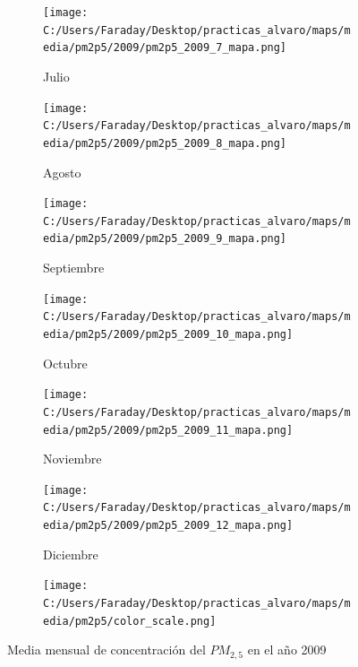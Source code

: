 \documentclass[12pt]{article}
\begin{document}
\begin{figure}[H]
\begin{subfigure}[H]{0.15\textwidth}
\texttt{[image: C:/Users/Faraday/Desktop/practicas\_alvaro/maps/media/pm2p5/2009/pm2p5\_2009\_7\_mapa.png]}
\captionsetup{labelformat=empty}
\caption{Julio}
\label{fig:map-pm2p5-2009-7}
\end{subfigure}
%
\begin{subfigure}[H]{0.15\textwidth}
\texttt{[image: C:/Users/Faraday/Desktop/practicas\_alvaro/maps/media/pm2p5/2009/pm2p5\_2009\_8\_mapa.png]}
\captionsetup{labelformat=empty}
\caption{Agosto}
\label{fig:map-pm2p5-2009-8}
\end{subfigure}
%
\begin{subfigure}[H]{0.15\textwidth}
\texttt{[image: C:/Users/Faraday/Desktop/practicas\_alvaro/maps/media/pm2p5/2009/pm2p5\_2009\_9\_mapa.png]}
\captionsetup{labelformat=empty}
\caption{Septiembre}
\label{fig:map-pm2p5-2009-9}
\end{subfigure}
%
\begin{subfigure}[H]{0.15\textwidth}
\texttt{[image: C:/Users/Faraday/Desktop/practicas\_alvaro/maps/media/pm2p5/2009/pm2p5\_2009\_10\_mapa.png]}
\captionsetup{labelformat=empty}
\caption{Octubre}
\label{fig:map-pm2p5-2009-10}
\end{subfigure}
%
\begin{subfigure}[H]{0.15\textwidth}
\texttt{[image: C:/Users/Faraday/Desktop/practicas\_alvaro/maps/media/pm2p5/2009/pm2p5\_2009\_11\_mapa.png]}
\captionsetup{labelformat=empty}
\caption{Noviembre}
\label{fig:map-pm2p5-2009-11}
\end{subfigure}
%
\begin{subfigure}[H]{0.15\textwidth}
\texttt{[image: C:/Users/Faraday/Desktop/practicas\_alvaro/maps/media/pm2p5/2009/pm2p5\_2009\_12\_mapa.png]}
\captionsetup{labelformat=empty}
\caption{Diciembre}
\label{fig:map-pm2p5-2009-12}
\end{subfigure}

\begin{subfigure}[H]{0.45\textwidth}
\texttt{[image: C:/Users/Faraday/Desktop/practicas\_alvaro/maps/media/pm2p5/color\_scale.png]}
\captionsetup{labelformat=empty}
\caption{}
\end{subfigure}

\vspace*{-7mm}
\caption{Media mensual de concentración del $PM_{2,5}$ en el año 2009}
\label{fig:map-pm2p5-2009}
\end{figure}
\end{document}
